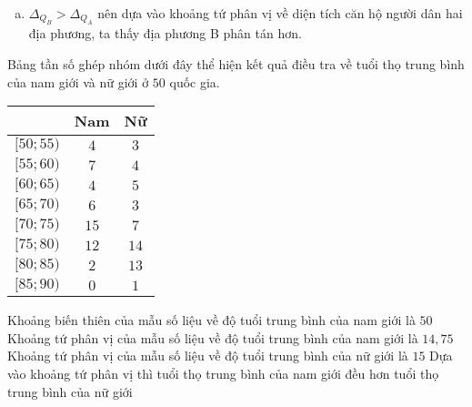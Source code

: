 \begin{ex}
{\begin{enumerate}[a)]
			\begin{itemize}
				\item [$\bullet$] Nhóm chứa $Q_1^B$ là $[60 ; 70)$. Suy ra
						$$Q_1^B=60+\dfrac{25 -15}{20} \cdot 10=65.$$
				\item [$\bullet$] Nhóm chứa $Q_3^B$ là $[80;90)$.Suy ra
					$$Q_3^B=80+\dfrac{75 -65}{20} \cdot 10= 85.$$
			\end{itemize}
			Vậy khoảng tứ phân vị  ghép nhóm diện tích căn hộ của địa phương B là là $\Delta_{Q_B} =85-65=20$. 
			\item $\Delta_{Q_B}>\Delta_{Q_A}$ nên dựa vào khoảng tứ phân vị về diện tích căn hộ người dân hai địa phương, ta thấy địa phương B phân tán hơn.
		\end{enumerate}
	}
\end{ex}

\begin{ex}%
	Bảng tần số ghép nhóm dưới đây thể hiện kết quả điều tra về tuổi thọ trung bình của nam giới và nữ giới ở $50$ quốc gia.
	\begin{center}
		\begin{tabular}{|c|c|c|}
			\hline
			\diagbox{Nhóm (Tuổi thọ)}{Giới tính} & Nam & Nữ \\
			\hline
			$[50;55)$ & $4$ & $3$ \\
			\hline
			$[55;60)$ & $7$ & $4$ \\
			\hline
			$[60;65)$ & $4$ & $5$ \\
			\hline
			$[65;70)$ & $6$ & $3$ \\
			\hline
			$[70;75)$ & $15$ & $7$ \\
			\hline
			$[75;80)$ & $12$ & $14$ \\
			\hline
			$[80;85)$ & $2$ & $13$ \\
			\hline
			$[85;90)$ & $0$ & $1$ \\
			\hline	
		\end{tabular}
	\end{center}
	\choiceTF
	{Khoảng biến thiên của mẫu số liệu về độ tuổi trung bình của nam giới là $50$}
	{Khoảng tứ phân vị của mẫu số liệu về độ tuổi trung bình của nam giới là $14{,}75$}
	{Khoảng tứ phân vị của mẫu số liệu về độ tuổi trung bình của nữ giới là $15$}
	{\True Dựa vào khoảng tứ phân vị thì tuổi thọ trung bình của nam giới đều hơn tuổi thọ trung bình của nữ giới}
\end{ex}
